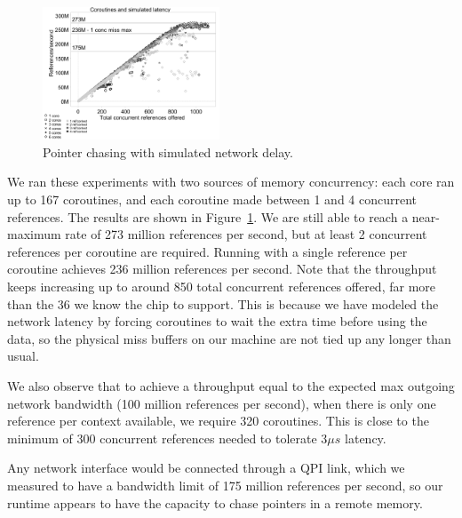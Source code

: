 \documentclass[10pt,nocopyrightspace,preprint]{sigplanconf}
\begin{document}
{%
\begin{figure}[h]
  \begin{center}
    \includegraphics[width=0.47\textwidth]{figures/multi-green-delay7800-edited.pdf}
  \end{center}
  \caption{Pointer chasing with simulated network delay.}
  \label{fig:network-delay}
\end{figure}

We ran these experiments with two sources of memory concurrency: each
core ran up to 167 coroutines, and each coroutine made between 1 and 4
concurrent references. The results are shown in
Figure~\ref{fig:network-delay}. We are still able to reach a
near-maximum rate of 273 million references per second, but at least 2
concurrent references per coroutine are required. Running with a single
reference per coroutine achieves 236 million references per
second. Note that the throughput keeps increasing up to around 850 total concurrent references offered, far more than the 36 we know the chip to support. This is because we have modeled the network latency by forcing coroutines to wait the extra time before using the data, so the physical miss buffers on our machine are not tied up any longer than usual.

We also observe that to achieve a throughput equal to the expected max outgoing network bandwidth (100 million references per second),  when there is only one reference per context available, we require 320 coroutines. This is close to the minimum of 300 concurrent references needed to tolerate $3 \mu s$ latency.

Any network interface would be connected through a QPI link,
which we measured to have a bandwidth limit of 175 million references
per second, so our runtime appears to have the capacity to chase pointers
in a remote memory. 



}
\end{document}

